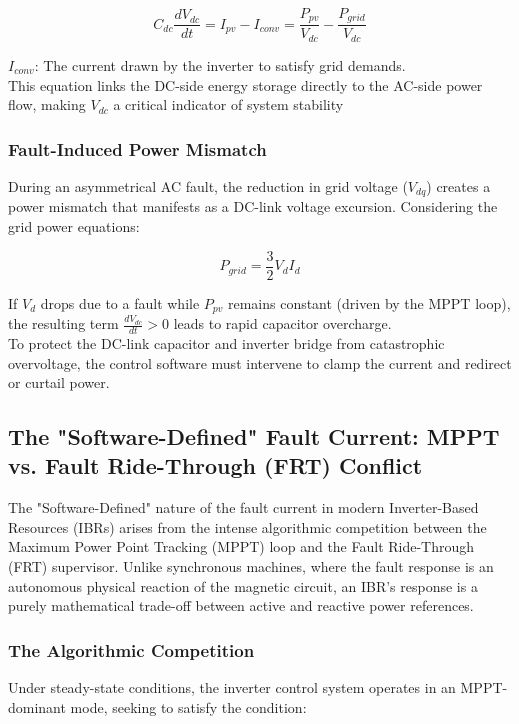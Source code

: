 \begin{equation}
\label{eq:vtdq}
C_{dc}\frac{dV_{dc}}{dt} = I_{pv} - I_{conv} = \frac{P_{pv}}{V_{dc}} - \frac{P_{grid}}{V_{dc}} 
\end{equation}


$I_{conv}$: The current drawn by the inverter to satisfy grid demands.
\\
This equation links the DC-side energy storage directly to the AC-side power flow, making $V_{dc}$ a critical indicator of system stability

\subsubsection{Fault-Induced Power Mismatch}

During an asymmetrical AC fault, the reduction in grid voltage ($V_{dq}$) creates a power mismatch that manifests as a DC-link voltage excursion. Considering the grid power equations:

\begin{equation}
\label{eq:vtdq}
P_{grid} = \frac{3}{2}V_d I_d
\end{equation}

If $V_d$ drops due to a fault while $P_{pv}$ remains constant (driven by the MPPT loop), the resulting term $\frac{dV_{dc}}{dt} > 0$ leads to rapid capacitor overcharge.
\\
To protect the DC-link capacitor and inverter bridge from catastrophic overvoltage, the control software must intervene to clamp the current and redirect or curtail power.





\subsection{The "Software-Defined" Fault Current: MPPT vs. Fault Ride-Through (FRT) Conflict}

The "Software-Defined" nature of the fault current in modern Inverter-Based Resources (IBRs) arises from the intense algorithmic competition between the Maximum Power Point Tracking (MPPT) loop and the Fault Ride-Through (FRT) supervisor. Unlike synchronous machines, where the fault response is an autonomous physical reaction of the magnetic circuit, an IBR's response is a purely mathematical trade-off between active and reactive power references.


\subsubsection{The Algorithmic Competition}
Under steady-state conditions, the inverter control system operates in an MPPT-dominant mode, seeking to satisfy the condition:

